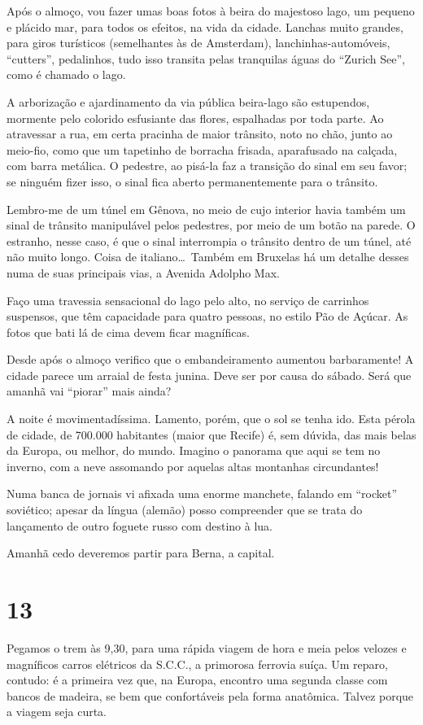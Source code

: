 Após o almoço, vou fazer umas boas fotos à beira do majestoso lago, um pequeno e plácido mar, para todos os efeitos, na vida da cidade. Lanchas muito grandes, para giros turísticos (semelhantes às de Amsterdam), lanchinhas-automóveis, ``cutters'', pedalinhos, tudo isso transita pelas tranquilas águas do ``Zurich See'', como é chamado o lago.

A arborização e ajardinamento da via pública beira-lago são estupendos, mormente pelo colorido esfusiante das flores, espalhadas por toda parte. Ao atravessar a rua, em certa pracinha de maior trânsito, noto no chão, junto ao meio-fio, como que um tapetinho de borracha frisada, aparafusado na calçada, com barra metálica. O pedestre, ao pisá-la faz a transição do sinal em seu favor; se ninguém fizer isso, o sinal fica aberto permanentemente para o trânsito.

Lembro-me de um túnel em Gênova, no meio de cujo interior havia também um sinal de trânsito manipulável pelos pedestres, por meio de um botão na parede. O estranho, nesse caso, é que o sinal interrompia o trânsito dentro de um túnel, até não muito longo. Coisa de italiano\ldots\ Também em Bruxelas há um detalhe desses numa de suas principais vias, a Avenida Adolpho Max.

Faço uma travessia sensacional do lago pelo alto, no serviço de carrinhos suspensos, que têm capacidade para quatro pessoas, no estilo Pão de Açúcar. As fotos que bati lá de cima devem ficar magníficas.

Desde após o almoço verifico que o embandeiramento aumentou barbaramente! A cidade parece um arraial de festa junina. Deve ser por causa do sábado. Será que amanhã vai ``piorar'' mais ainda?

A noite é movimentadíssima. Lamento, porém, que o sol se tenha ido. Esta pérola de cidade, de 700.000 habitantes (maior que Recife) é, sem dúvida, das mais belas da Europa, ou melhor, do mundo. Imagino o panorama que aqui se tem no inverno, com a neve assomando por aquelas altas montanhas circundantes!

Numa banca de jornais vi afixada uma enorme manchete, falando em ``rocket'' soviético; apesar da língua (alemão) posso compreender que se trata do lançamento de outro foguete russo com destino à lua.

Amanhã cedo deveremos partir para Berna, a capital.

\section*{13 \adfflatleafright {}}
Pegamos o trem às 9,30, para uma rápida viagem de hora e meia pelos velozes e magníficos carros elétricos da S.C.C., a primorosa ferrovia suíça. Um reparo, contudo: é a primeira vez que, na Europa, encontro uma segunda classe com bancos de madeira, se bem que confortáveis pela forma anatômica. Talvez porque a viagem seja curta.

